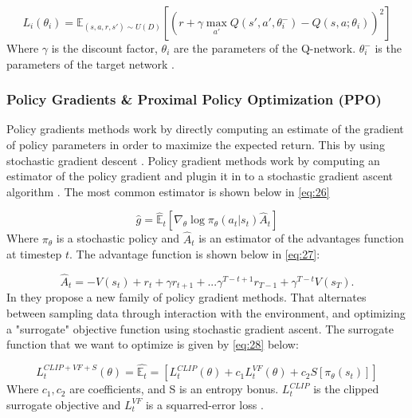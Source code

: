 \documentclass{kththesis}
\theoremstyle{definition}
\begin{document}
\begin{equation}
    \label{eq:25}
    L_i(\theta_i) = \mathbb{E}_{(s,a,r,s') \sim U(D)} \left[\left(r+ \gamma \underset{a'}{\operatorname{max}}Q(s', a', \theta_{i}^{-})-Q(s,a;\theta_i)  \right)^2 \right]
\end{equation}
Where $\gamma$ is the discount factor, $\theta_i$ are the parameters of the Q-network. $\theta_{i}^{-}$ is the parameters of the target network \parencite{mnih2015human}.


\subsubsection*{Policy Gradients \& Proximal Policy Optimization (PPO)}
Policy gradients methods work by  directly computing an estimate of the gradient of policy parameters in order to maximize the expected return. This by using stochastic gradient descent \parencite{bansal2017emergent}. 
Policy gradient methods work by computing an estimator of the policy gradient and plugin it in to a stochastic gradient ascent algorithm \parencite{schulman2017proximal}. The most common estimator is shown below in \autoref{eq:26}

\begin{equation}
    \label{eq:26}
    \hat{g} = \hat{\mathbb{E}}_{t}\left[\nabla_{\theta} \log{\pi_{\theta}(a_t|s_t)\hat{A}_{t}} \right]
\end{equation}
Where $\pi_{\theta}$ is a stochastic policy and $\hat{A}_{t}$ is an estimator of the advantages function at timestep $t$. The advantage function is shown below in \autoref{eq:27}:

\begin{equation}
    \label{eq:27}
    \hat{A}_{t} = -V(s_t) + r_t +\gamma r_{t+1} + ... \gamma^{T-t+1} r_{T-1} + \gamma^{T-t}V(s_T).
\end{equation}
In \textcite{schulman2017proximal} they propose a new family of policy gradient methods. That alternates between sampling data through interaction with the environment, and optimizing a "surrogate" objective function using stochastic gradient ascent.  The surrogate function that we want to optimize is given by \autoref{eq:28} below: 

\begin{equation}
    \label{eq:28}
    L_{t}^{CLIP + VF+ S}(\theta) = \hat{\mathbb{E}_{t}} = \left[L_{t}^{CLIP}(\theta) + c_1 L_{t}^{VF}(\theta) + c_2S[\pi_{\theta}(s_t)]\right]
\end{equation}
Where $c_1,c_2$ are coefficients, and S is an entropy bonus. $L_{t}^{CLIP}$ is the clipped surrogate objective and $L_{t}^{VF}$ is a squarred-error loss \parencite{schulman2017proximal}.
\end{document}
